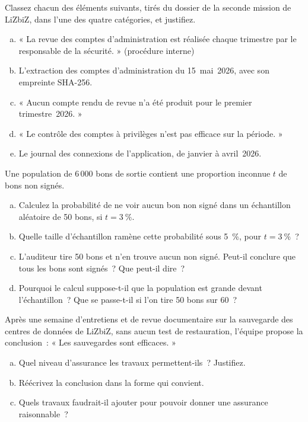 \begin{boxexo}[title={\ding{45}\quad Exercice~1.2. Critère, preuve, constatation, conclusion \niveaubase}]
Classez chacun des éléments suivants, tirés du dossier de la seconde
mission de LiZbiZ, dans l'une des quatre catégories, et justifiez.
\begin{enumerate}[(a)]
    \item « La revue des comptes d'administration est réalisée chaque
          trimestre par le responsable de la sécurité. » (procédure interne)
    \item L'extraction des comptes d'administration du 15~mai~2026, avec son
          empreinte SHA-256.
    \item « Aucun compte rendu de revue n'a été produit pour le premier
          trimestre~2026. »
    \item « Le contrôle des comptes à privilèges n'est pas efficace sur la
          période. »
    \item Le journal des connexions de l'application, de janvier à
          avril~2026.
\end{enumerate}
\end{boxexo}

\begin{boxexo}[title={\ding{45}\quad Exercice~1.3. Le risque de ne pas voir \niveaumoyen}]
Une population de 6\,000 bons de sortie contient une proportion inconnue
$t$ de bons non signés.
\begin{enumerate}[(a)]
    \item Calculez la probabilité de ne voir aucun bon non signé dans un
          échantillon aléatoire de 50 bons, si $t = 3~\%$.
    \item Quelle taille d'échantillon ramène cette probabilité sous 5~\%,
          pour $t = 3~\%$~?
    \item L'auditeur tire 50 bons et n'en trouve aucun non signé. Peut-il
          conclure que tous les bons sont signés~? Que peut-il dire~?
    \item Pourquoi le calcul suppose-t-il que la population est grande
          devant l'échantillon~? Que se passe-t-il si l'on tire 50 bons sur
          60~?
\end{enumerate}
\end{boxexo}

\begin{boxexo}[title={\ding{45}\quad Exercice~1.4. Raisonnable ou limitée \niveaumoyen}]
Après une semaine d'entretiens et de revue documentaire sur la sauvegarde
des centres de données de LiZbiZ, sans aucun test de restauration,
l'équipe propose la conclusion~: « Les sauvegardes sont efficaces. »
\begin{enumerate}[(a)]
    \item Quel niveau d'assurance les travaux permettent-ils~? Justifiez.
    \item Réécrivez la conclusion dans la forme qui convient.
    \item Quels travaux faudrait-il ajouter pour pouvoir donner une
          assurance raisonnable~?
\end{enumerate}
\end{boxexo}


